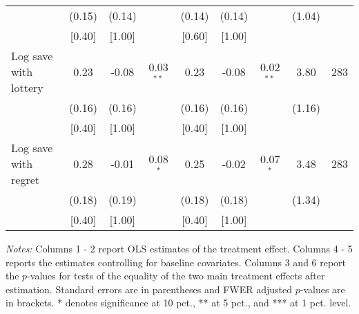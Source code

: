 \begin{table}[htbp]
{\begin{threeparttable}
\begin{tabular}{l*{8}{c}}
          &   (0.15)&   (0.14)&         &   (0.14)&   (0.14)&         &   (1.04)&         \\
          &   [0.40]&   [1.00]&         &   [0.60]&   [1.00]&         &         &         \\
Log save with lottery&     0.23&    -0.08&0.03$^{**}$&     0.23&    -0.08&0.02$^{**}$&     3.80&      283\\
          &   (0.16)&   (0.16)&         &   (0.16)&   (0.16)&         &   (1.16)&         \\
          &   [0.40]&   [1.00]&         &   [0.40]&   [1.00]&         &         &         \\
Log save with regret&     0.28&    -0.01&0.08$^{*}$&     0.25&    -0.02&0.07$^{*}$&     3.48&      283\\
          &   (0.18)&   (0.19)&         &   (0.18)&   (0.18)&         &   (1.34)&         \\
          &   [0.40]&   [1.00]&         &   [0.40]&   [1.00]&         &         &         \\
\bottomrule \end{tabular} \begin{tablenotes}[flushleft] \footnotesize \item \emph{Notes:} Columns 1 - 2 report OLS estimates of the treatment effect. Columns 4 - 5 reports the estimates controlling for baseline covariates. Columns 3 and 6 report the \(p\)-values for tests of the equality of the two main treatment effects after estimation. Standard errors are in parentheses and FWER adjusted \(p\)-values are in brackets. * denotes significance at 10 pct., ** at 5 pct., and *** at 1 pct. level. \end{tablenotes} \end{threeparttable} } \end{table}
